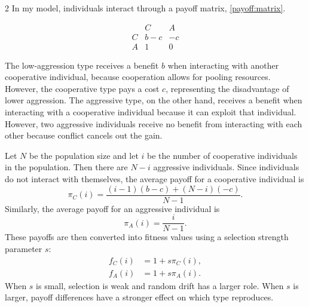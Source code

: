 \documentclass[11pt]{article}
\begin{document}
\begin{multicols}{2}
In my model, individuals interact through a payoff matrix, \eqref{payoff:matrix}. 

\begin{equation}\label{payoff:matrix}
\begin{array}{c|cc}
 & C & A \\ \hline
C & b-c & -c \\
A & 1 & 0
\end{array}
\end{equation}

The low-aggression type receives a benefit $b$ when interacting with another cooperative individual, because cooperation allows for pooling resources. However, the cooperative type pays a cost $c$, representing the disadvantage of lower aggression. The aggressive type, on the other hand, receives a benefit when interacting with a cooperative individual because it can exploit that individual. However, two aggressive individuals receive no benefit from interacting with each other because conflict cancels out the gain. 

Let $N$ be the population size and let $i$ be the number of cooperative individuals in the population. Then there are $N-i$ aggressive individuals. Since individuals do not interact with themselves, the average payoff for a cooperative individual is
\begin{equation}\label{payoff:C}
\pi_C(i) =
\frac{(i-1)(b-c) + (N-i)(-c)}{N-1}.
\end{equation}
Similarly, the average payoff for an aggressive individual is
\begin{equation}\label{payoff:A}
\pi_A(i) =
\frac{i}{N-1}.
\end{equation}
These payoffs are then converted into fitness values using a selection strength parameter $s$:
\begin{align}
f_C(i) &= 1 + s\pi_C(i), \label{fitness:C}\\
f_A(i) &= 1 + s\pi_A(i). \label{fitness:A}
\end{align}
When $s$ is small, selection is weak and random drift has a larger role. When $s$ is larger, payoff differences have a stronger effect on which type reproduces.


\end{multicols}
\end{document}
